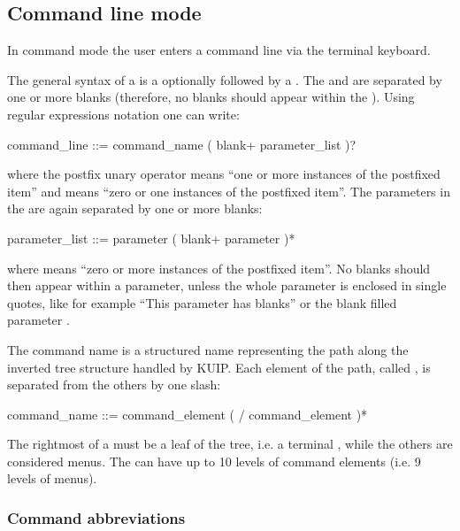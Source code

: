 \subsection{Command line mode}

In command mode the user enters a command line via the terminal keyboard.

The general syntax of a 
is a  optionally followed by a .
The  and  are
separated by one or more blanks (therefore, no blanks should appear
within the ). 
Using regular expressions notation one can write:
\begin{XMP}
command_line  ::=  command_name ( blank+ parameter_list )?
\end{XMP}
where the postfix unary operator  means ``one or more instances of the
postfixed item'' and  means ``zero or one instances of the postfixed
item''.
The parameters in the  are again separated by one or more
blanks:
\begin{XMP}
parameter_list  ::=  parameter ( blank+ parameter )*
\end{XMP}
where  means ``zero or more instances of the postfixed item''.
No blanks should then appear within a parameter, unless the whole parameter
is enclosed in single quotes, like for example ``This parameter has blanks''
or the blank filled parameter .

The command name is a structured name representing the path along the
inverted tree structure handled by KUIP. 
Each element of the path,
called , is separated from the others by one slash:
\begin{XMP}
command_name  ::=  command_element ( / command_element )*
\end{XMP}

The rightmost  of a  
must be a leaf of the tree,
i.e. a terminal , while the others are considered menus.
The  can have up to 10 levels of command elements (i.e. 9 levels
of menus).
%
%
\subsubsection{Command abbreviations}


